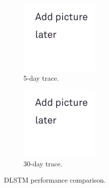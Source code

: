 \begin{figure}[t!]
	\centering
	
	\begin{subfigure}[b]{0.49\linewidth}
		\includegraphics[width=\linewidth]{pics/todo.png}
		\caption{5-day trace.}
	\end{subfigure}
	\begin{subfigure}[b]{0.49\linewidth}
		\includegraphics[width=\linewidth]{pics/todo.png}
		\caption{30-day trace.}
	\end{subfigure}
	\caption{DLSTM performance comparison.}
	\label{fig:dlstm}
\end{figure}